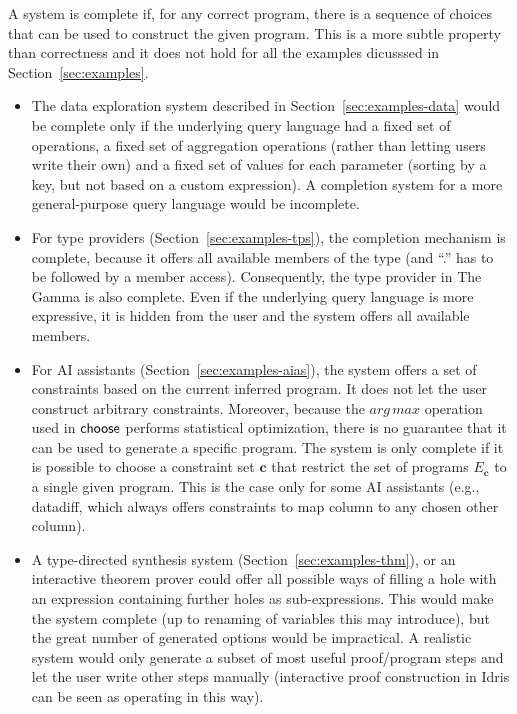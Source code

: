 \documentclass[a4paper,UKenglish,cleveref, autoref, thm-restate]{lipics-v2021}
\newcommand{\ident}[1]{\textsf{#1}}
\newcommand{\select}{\textnormal{\ident{choose}}}
\begin{document}
A system is complete if, for any correct program, there is a sequence of choices that can be
used to construct the given program. This is a more subtle property than correctness and
it does not hold for all the examples dicusssed in Section~\ref{sec:examples}.

\begin{itemize}
\setlength{\itemsep}{5pt}
\item The data exploration system described in Section~\ref{sec:examples-data} would be complete
  only if the underlying query language had a fixed set of operations, a fixed set of aggregation
  operations (rather than letting users write their own) and a fixed set of values for each
  parameter (sorting by a key, but not based on a custom expression). A completion system for a
  more general-purpose query language would be incomplete.

\item For type providers (Section~\ref{sec:examples-tps}), the completion mechanism is complete,
  because it offers all available members of the type (and ``.'' has to be followed by a member
  access). Consequently, the type provider in The Gamma is also complete. Even if the underlying
  query language is more expressive, it is hidden from the user and the system offers all
  available members.

\item For AI assistants (Section~\ref{sec:examples-aias}), the system offers a set of constraints
  based on the current inferred program. It does not let the user construct arbitrary constraints.
  Moreover, because the $\mathit{arg\,max}$ operation used in $\select$ performs statistical
  optimization, there is no guarantee that it can be used to generate a specific program.
  The system is only complete if it is possible to choose a constraint set $\boldsymbol{c}$ that
  restrict the set of programs $E_\boldsymbol{c}$ to a single given program. This is the case
  only for some AI assistants (e.g., datadiff, which always offers constraints to map column to
  any chosen other column).

\item A type-directed synthesis system (Section~\ref{sec:examples-thm}), or an interactive theorem
  prover could offer all possible ways of filling a hole with an expression containing further
  holes as sub-expressions. This would make the system complete (up to renaming of variables this
  may introduce), but the great number of generated options would be impractical. A realistic
  system would only generate a subset of most useful proof/program steps and let the user write
  other steps manually (interactive proof construction in Idris can be seen as operating in this way).
\end{itemize}
\end{document}
